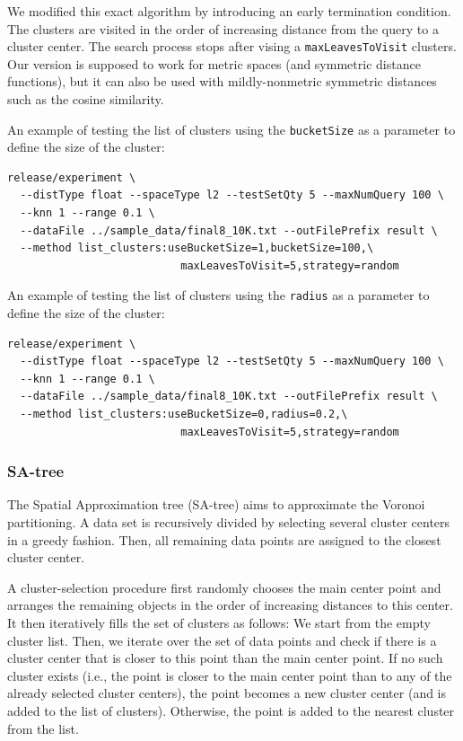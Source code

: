 \documentclass[runningheads,a4paper]{llncs}
\newcommand{\ttt}[1]{\texttt{#1}}
\begin{document}
{We modified this exact algorithm by introducing an early termination condition.
The clusters are visited in the order of increasing distance from
the query to a cluster center.
The search process stops after vising a \ttt{maxLeavesToVisit} clusters.
Our version is supposed to work for metric spaces (and symmetric distance functions),
but it can also be used with mildly-nonmetric symmetric distances such as the cosine similarity.

An example of testing the list of clusters using the \ttt{bucketSize} as a parameter to define
the size of the cluster:
{
\footnotesize
\begin{verbatim}
release/experiment \
  --distType float --spaceType l2 --testSetQty 5 --maxNumQuery 100 \
  --knn 1 --range 0.1 \
  --dataFile ../sample_data/final8_10K.txt --outFilePrefix result \
  --method list_clusters:useBucketSize=1,bucketSize=100,\
                           maxLeavesToVisit=5,strategy=random
\end{verbatim}
}
An example of testing the list of clusters using the \ttt{radius} as a parameter to define
the size of the cluster:
{
\footnotesize
\begin{verbatim}
release/experiment \
  --distType float --spaceType l2 --testSetQty 5 --maxNumQuery 100 \
  --knn 1 --range 0.1 \
  --dataFile ../sample_data/final8_10K.txt --outFilePrefix result \
  --method list_clusters:useBucketSize=0,radius=0.2,\
                           maxLeavesToVisit=5,strategy=random
\end{verbatim}
}

\subsubsection{SA-tree}
The Spatial Approximation tree (SA-tree)  \cite{navarro2002searching} aims
to approximate the Voronoi partitioning.
A data set is recursively divided by selecting several cluster centers in a greedy fashion.
Then, all remaining data points are assigned to the closest cluster center.

A cluster-selection procedure first randomly chooses the main center point and arranges the
remaining objects in the order of increasing distances to this center.
It then iteratively fills the set of clusters as follows: We start from the empty cluster 
list. Then, we iterate over the set of data points and check if there is a cluster center that
is closer to this point than the main center point. 
If no such cluster exists (i.e., the point is closer to the main center point than to any
of the already selected cluster centers), the point becomes a new cluster center 
(and is added to the list of clusters).
Otherwise, the point is added to the nearest cluster from the list.

}
\end{document}

